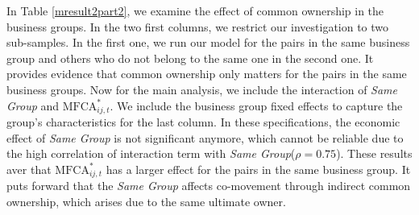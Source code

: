 	In Table  \ref{mresult2part2}, we examine the effect of common ownership in the business groups. In the two first columns, we restrict our investigation to two sub-samples. In the first one, we run our model for the pairs in the same business group and others who do not belong to the same one in the second one. It provides evidence that common ownership only matters for the pairs in the same business groups.	
	Now for the main analysis, we include the interaction of \textit{Same Group} and $\text{MFCA}^*_{ij,t}$. We include the business group fixed effects to capture the group's characteristics for the last column. In these specifications, the economic effect of \textit{Same Group} is not significant anymore, which cannot be reliable due to the high correlation of interaction term with \textit{Same Group}($\rho = 0.75$). These results aver that $\text{MFCA}^*_{ij,t}$ has a larger effect for the pairs in the same business group. It puts forward that the \textit{Same Group}  affects co-movement through indirect common ownership, which arises due to the same ultimate owner. 
	
	
	
